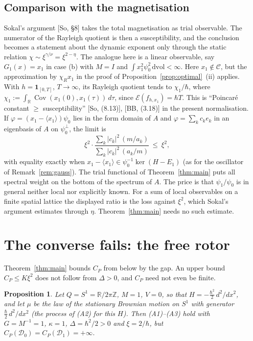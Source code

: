 \documentclass[11pt,a4paper]{article}
\newtheorem{proposition}[theorem]{Proposition}
\theoremstyle{definition}
\theoremstyle{remark}
\newcommand{\R}{\mathbb{R}}
\newcommand{\Cov}{\operatorname{Cov}}
\newcommand{\cE}{\mathcal{E}}
\newcommand{\cD}{\mathcal{D}}
\newcommand{\dvol}{\,\mathrm{dvol}}
\begin{document}
\subsection{Comparison with the magnetisation}

Sokal's argument [So, \S8] takes the total magnetisation as trial observable.
The numerator of the Rayleigh quotient is then a susceptibility, and the conclusion becomes a statement about the dynamic exponent only through the static relation $\chi\sim\xi^{\gamma/\nu}=\xi^{2-\eta}$.
The analogue here is a linear observable, say $G_1(x)=x_1$ in case (b) with $M=I$ and $\int x_1^2\psi_0^2\dvol<\infty$.
Here $x_1\notin\mathcal C$, but the approximation by $\chi_Rx_1$ in the proof of Proposition~\ref{prop:optimal}~(ii) applies.
With $h=\mathbf 1_{[0,T]}$, $T\to\infty$, its Rayleigh quotient tends to $\chi_1/\hbar$, where $\chi_1:=\int_\R\Cov(x_1(0),x_1(\tau))\,d\tau$, since $\cE(f_{h,x_1})=\hbar T$.
This is ``Poincar\'e constant $\ge$ susceptibility'' [So, (8.13)], [BB, (3.18)] in the present normalisation.
If $\varphi=(x_1-\langle x_1\rangle)\psi_0$ lies in the form domain of $A$ and $\varphi=\sum_kc_ke_k$ in an eigenbasis of $A$ on $\psi_0^\perp$, the limit is
\[
  \xi^2\cdot\frac{\sum_k|c_k|^2\,(m/a_k)}{\sum_k|c_k|^2\,(a_k/m)}\ \le\ \xi^2 ,
\]
with equality exactly when $x_1-\langle x_1\rangle\in\psi_0^{-1}\ker(H-E_1)$ (as for the oscillator of Remark~\ref{rem:gauss}).
The trial functional of Theorem~\ref{thm:main} puts all spectral weight on the bottom of the spectrum of $A$.
The price is that $\psi_1/\psi_0$ is in general neither local nor explicitly known.
For a sum of local observables on a finite spatial lattice the displayed ratio is the loss against $\xi^2$, which Sokal's argument estimates through $\eta$.
Theorem~\ref{thm:main} needs no such estimate.

\section{The converse fails: the free rotor}\label{sec:rotor}

Theorem~\ref{thm:main} bounds $C_P$ from below by the gap. An upper bound $C_P\le K\xi^2$ does not follow from $\Delta>0$, and $C_P$ need not even be finite.

\begin{proposition}\label{prop:rotor}
Let $Q=S^1=\R/2\pi\mathbb Z$, $M=1$, $V=0$, so that $H=-\tfrac{\hbar^2}{2}\,d^2/dx^2$, and let $\mu$ be the law of the stationary Brownian motion on $S^1$ with generator $\tfrac{\hbar}{2}\,d^2/dx^2$ (the process of (A2) for this $H$).
Then (A1)--(A3) hold with $G=M^{-1}=1$, $\kappa=1$, $\Delta=\hbar^2/2>0$ and $\xi=2/\hbar$, but $C_P(\cD_0)=C_P(\cD_1)=+\infty$.
\end{proposition}
\end{document}
